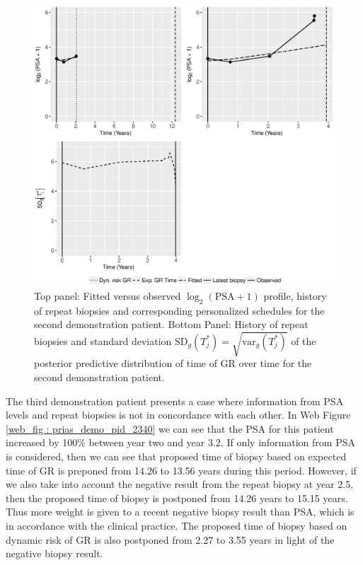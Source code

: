 \begin{figure}
\centerline{\includegraphics[width=\columnwidth]{images/prias_demo/case_3174_t3_log2psa_plus1.eps}}
\caption{Top panel: Fitted versus observed $\log_2 (\mbox{PSA} + 1)$ profile, history of repeat biopsies and corresponding personalized schedules for the second demonstration patient. Bottom Panel: History of repeat biopsies and standard deviation $\mbox{SD}_g(T^*_j) = \sqrt{\mbox{var}_g(T^*_j)}$ of the posterior predictive distribution of time of GR over time for the second demonstration patient.}
\label{fig : prias_demo_pid_3174}
\end{figure}

\clearpage

The third demonstration patient presents a case where information from PSA levels and repeat biopsies is not in concordance with each other. In Web Figure \ref{web_fig : prias_demo_pid_2340} we can see that the PSA for this patient increased by 100\% between year two and year 3.2. If only information from PSA is considered, then we can see that proposed time of biopsy based on expected time of GR is preponed from 14.26 to 13.56 years during this period. However, if we also take into account the negative result from the repeat biopsy at year 2.5, then the proposed time of biopsy is postponed from 14.26 years to 15.15 years. Thus more weight is given to a recent negative biopsy result than PSA, which is in accordance with the clinical practice. The proposed time of biopsy based on dynamic risk of GR is also postponed from 2.27 to 3.55 years in light of the negative biopsy result.

